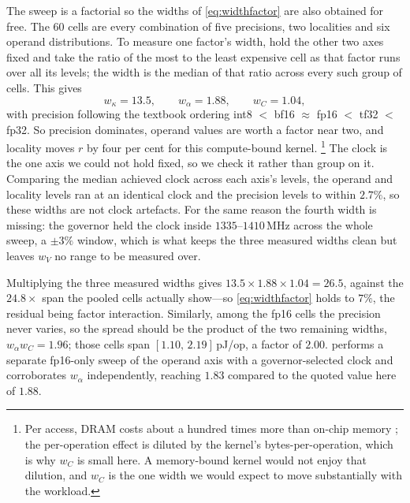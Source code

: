 \documentclass{article}
\theoremstyle{plain}
\theoremstyle{definition}
\theoremstyle{remark}
\begin{document}
The sweep is a factorial so the widths of \cref{eq:widthfactor} are also obtained for free.
The $60$ cells are every combination of five
precisions, two localities and six operand distributions. To measure one
factor's width, hold the other two axes fixed and take the ratio of the most to
the least expensive cell as that factor runs over all its levels; the width is
the median of that ratio across every such group of cells. This gives
\begin{equation}
	w_\kappa = 13.5, \qquad w_\alpha = 1.88, \qquad w_C = 1.04,
	\label{eq:measuredwidths}
\end{equation}
with precision following the textbook ordering
int8 $<$ bf16 $\approx$ fp16 $<$ tf32 $<$ fp32. So precision dominates, operand
values are worth a factor near two, and locality moves $r$ by four per cent for
this compute-bound kernel. \footnote{Per access, DRAM costs about a hundred times more than on-chip
memory \citep{horowitz2014computing}; the per-operation effect is diluted by the
kernel's bytes-per-operation, which is why $w_C$ is small here. A memory-bound
kernel would not enjoy that dilution, and $w_C$ is the one width we would expect
to move substantially with the workload.} The clock is the one axis we could not hold fixed, so we check it rather than
group on it. Comparing the median achieved clock across each axis's levels,
the operand and locality levels ran at an identical clock and the precision
levels to within $2.7\%$, so these widths are not clock artefacts. For the same
reason the fourth width is missing: the governor held the clock inside
$1335$--$1410$\,MHz across the whole sweep, a $\pm 3\%$ window, which is what
keeps the three measured widths clean but leaves $w_V$ no range to be measured
over. 

Multiplying the three measured widths gives
$13.5 \times 1.88 \times 1.04 = 26.5$, against the $24.8\times$ span the pooled
cells actually show---so \cref{eq:widthfactor} holds to $7\%$, the residual
being factor interaction. Similarly, among the fp16 cells the precision never varies, so
the spread should be the product of the two remaining widths,
$w_\alpha w_C = 1.96$; those cells span $[1.10,\,2.19]$\,pJ/op, a factor of
$2.00$.  performs a separate fp16-only sweep of the operand axis with a governor-selected clock and corroborates $w_\alpha$ independently, reaching $1.83$ compared to the quoted value here of $1.88$.
\end{document}
